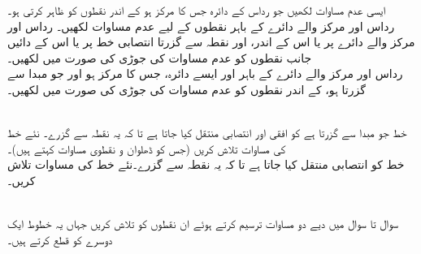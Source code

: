 ایسی  عدم مساوات لکھیں جو رداس  کے دائرہ جس کا مرکز  ہو کے اندر نقطوں کو ظاہر کرتی ہو۔\\
رداس  اور مرکز  والے دائرے کے باہر نقطوں کے لیے عدم مساوات لکھیں۔
رداس  اور مرکز  والے  دائرے پر یا اس کے اندر، اور نقطہ   سے گزرتا انتصابی خط پر یا اس کے دائیں جانب نقطوں کو عدم مساوات کی جوڑی کی صورت میں لکھیں۔\\
رداس  اور مرکز والے  دائرے کے باہر اور ایسے دائرہ، جس کا مرکز  ہو اور جو مبدا سے گزرتا ہو، کے اندر نقطوں کو عدم مساوات کی جوڑی کی صورت میں لکھیں۔

\\

خط  جو مبدا سے گزرتا ہے کو افقی اور انتصابی منتقل کیا جاتا ہے تا کہ یہ نقطہ  سے گزرے۔ نئے خط کی مساوات تلاش کریں (جس کو ڈھلوان و نقطوی مساوات کہتے ہیں)۔\\
خط  کو انتصابی منتقل کیا جاتا ہے تا کہ یہ نقطہ  سے گزرے۔نئے خط کی مساوات تلاش کریں۔

\\

سوال  تا سوال  میں دیے دو مساوات ترسیم کرتے ہوئے ان نقطوں کو تلاش کریں جہاں یہ خطوط ایک دوسرے کو قطع کرتے ہیں۔

